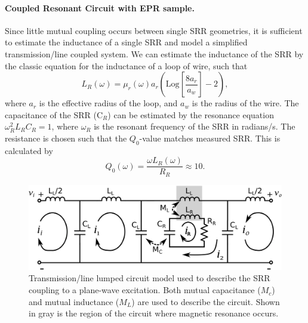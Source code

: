\noindent \paragraph*{Coupled Resonant Circuit with EPR sample.} Since little mutual coupling occurs between single SRR geometries, it is sufficient to estimate the inductance of a single SRR and model a simplified transmission\-/line coupled system. We can estimate the inductance of the SRR by the classic equation for the inductance of a loop of wire, such that 
\begin{equation}
    L_R(\omega) = \mu_r(\omega) a_r \left(\text{Log}\left[ \frac{8 a_r}{a_w} \right] -2\right),
\end{equation}
where $a_r$ is the effective radius of the loop, and $a_w$ is the radius of the wire. The capacitance of the SRR (C$_R$) can be estimated by the resonance equation $\omega_R^2 L_RC_R=1$, where $\omega_R$ is the resonant frequency of the SRR in radians/s. The resistance is chosen such that the $Q_0$-value matches measured SRR. This is calculated by
\begin{equation}
    Q_0(\omega) = \frac{\omega L_R(\omega)}{R_R} \approx 10.
\end{equation}

\begin{figure}[htp]
\centering
   \includegraphics[width=\textwidth]{Kapitel/Ch3-Images/03-CircuitFig.eps}%
  \caption[Transmission\-/line lumped circuit model.]{Transmission\-/line lumped circuit model used to describe the SRR coupling to a plane-wave excitation. Both mutual capacitance ($M_c$) and mutual inductance ($M_L$) are used to describe the circuit. Shown in gray is the region of the circuit where magnetic resonance occurs.}
  \label{ch3-fig:circuit}
\end{figure}

